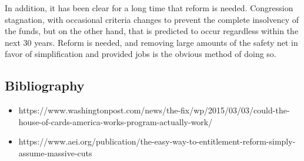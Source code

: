 \documentclass[12pt]{article}
\begin{document}
In addition, it has been clear for a long time that reform is needed. Congression stagnation, with occasional criteria changes to prevent the complete insolvency of the funds, but on the other hand, that is predicted to occur regardless within the next 30 years. Reform is needed, and removing large amounts of the safety net in favor of simplification and provided jobs is the obvious method of doing so.

\subsection*{Bibliography}
\begin{itemize}
\item https://www.washingtonpost.com/news/the-fix/wp/2015/03/03/could-the-house-of-cards-america-works-program-actually-work/
\item https://www.aei.org/publication/the-easy-way-to-entitlement-reform-simply-assume-massive-cuts
\end{itemize}
\end{document}
